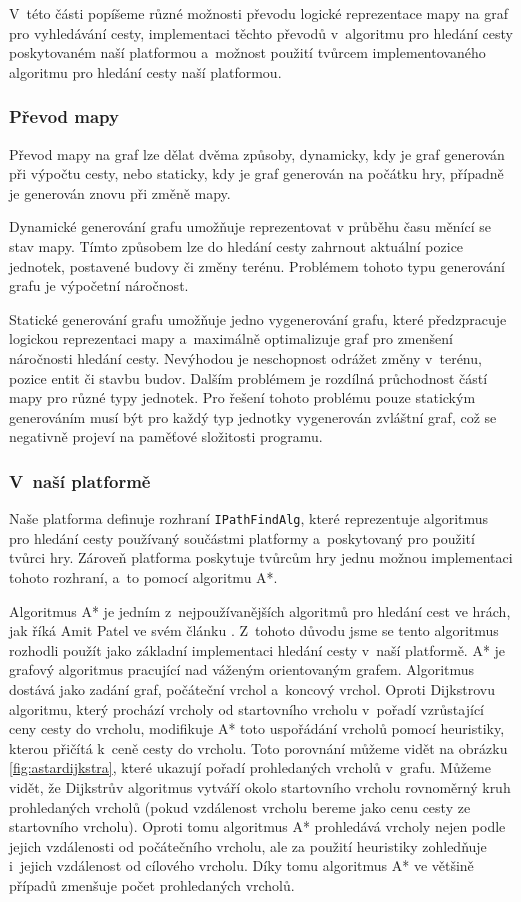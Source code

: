 V~této části popíšeme různé možnosti převodu logické reprezentace mapy na graf pro vyhledávání cesty, implementaci těchto převodů v~algoritmu pro hledání cesty poskytovaném naší platformou a~možnost použití tvůrcem implementovaného algoritmu pro hledání cesty naší platformou.


\subsubsection{Převod mapy}
Převod mapy na graf lze dělat dvěma způsoby, dynamicky, kdy je graf generován při výpočtu cesty, nebo staticky, kdy je graf generován na počátku hry, případně je generován znovu při změně mapy.

Dynamické generování grafu umožňuje reprezentovat v průběhu času měnící se stav mapy. Tímto způsobem lze do hledání cesty zahrnout aktuální pozice jednotek, postavené budovy či změny terénu. Problémem tohoto typu generování grafu je výpočetní náročnost.

Statické generování grafu umožňuje jedno vygenerování grafu, které předzpracuje logickou reprezentaci mapy a~maximálně optimalizuje graf pro zmenšení náročnosti hledání cesty. Nevýhodou je neschopnost odrážet změny v~terénu, pozice entit či stavbu budov. Dalším problémem je rozdílná průchodnost částí mapy pro různé typy jednotek. Pro řešení tohoto problému pouze statickým generováním musí být pro každý typ jednotky vygenerován zvláštní graf, což se negativně projeví na paměťové složitosti programu.

\subsubsection{V~naší platformě}
\label{sec:astar}
Naše platforma definuje rozhraní \texttt{IPathFindAlg}, které reprezentuje algoritmus pro hledání cesty používaný součástmi platformy a~poskytovaný pro použití tvůrci hry. Zároveň platforma poskytuje tvůrcům hry jednu možnou implementaci tohoto rozhraní, a~to pomocí algoritmu A*.

Algoritmus A* je jedním z~nejpoužívanějších algoritmů pro hledání cest ve hrách, jak říká Amit Patel ve svém článku \citep{site:introastar}. Z~tohoto důvodu jsme se tento algoritmus rozhodli použít jako základní implementaci hledání cesty v~naší platformě. A* je grafový algoritmus pracující nad váženým orientovaným grafem. Algoritmus dostává jako zadání graf, počáteční vrchol a~koncový vrchol. Oproti Dijkstrovu algoritmu, který prochází vrcholy od startovního vrcholu v~pořadí vzrůstající ceny cesty do vrcholu, modifikuje A* toto uspořádání vrcholů pomocí heuristiky, kterou přičítá k~ceně cesty do vrcholu. Toto porovnání můžeme vidět na obrázku \ref{fig:astardijkstra}, které ukazují pořadí prohledaných vrcholů v~grafu. Můžeme vidět, že Dijkstrův algoritmus vytváří okolo startovního vrcholu rovnoměrný kruh prohledaných vrcholů (pokud vzdálenost vrcholu bereme jako cenu cesty ze startovního vrcholu). Oproti tomu algoritmus A* prohledává vrcholy nejen podle jejich vzdálenosti od počátečního vrcholu, ale za použití heuristiky zohledňuje i~jejich vzdálenost od cílového vrcholu. Díky tomu algoritmus A* ve většině případů zmenšuje počet prohledaných vrcholů.

